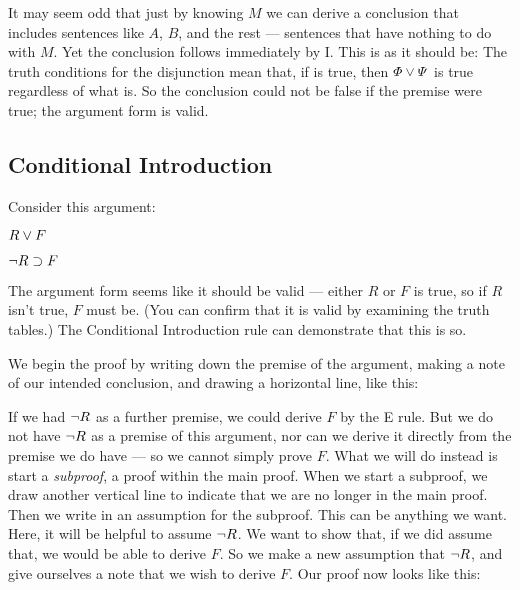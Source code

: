 \begin{ndproof}
\end{ndproof}

It may seem odd that just by knowing $M$ we can derive a conclusion that includes sentences like $A$, $B$, and the rest --- sentences that have nothing to do with $M$. Yet the conclusion follows immediately by {\eor}I. This is as it should be: The truth conditions for the disjunction mean that, if \metaA{} is true, then $\varPhi{}\vee \varPsi{}$ is true regardless of what \metaB{} is. So the conclusion could not be false if the premise were true; the argument form is valid.

\subsection{Conditional Introduction}

Consider this argument:
\begin{earg}
\item[] $R \vee F$
\item[\therefore] $\neg R \supset F$
\end{earg}
The argument form seems like it should be valid --- either $R$ or $F$ is true, so if $R$ isn't true, $F$ must be. (You can confirm that it is valid by examining the truth tables.) The Conditional Introduction rule can demonstrate that this is so.

We begin the proof by writing down the premise of the argument, making a note of our intended conclusion, and drawing a horizontal line, like this:

\begin{ndproof}
	 
\end{ndproof}

If we had $\neg R$ as a further premise, we could derive $F$ by the {\eor}E rule. But we do not have $\neg R$ as a premise of this argument, nor can we derive it directly from the premise we do have --- so we cannot simply prove $F$. What we will do instead is start a \emph{subproof}, a proof within the main proof. When we start a subproof, we draw another vertical line to indicate that we are no longer in the main proof. Then we write in an assumption for the subproof. This can be anything we want. Here, it will be helpful to assume $\neg R$. We want to show that, if we did assume that, we would be able to derive $F$. So we make a new assumption that $\neg R$, and give ourselves a note that we wish to derive $F$. Our proof now looks like this:

